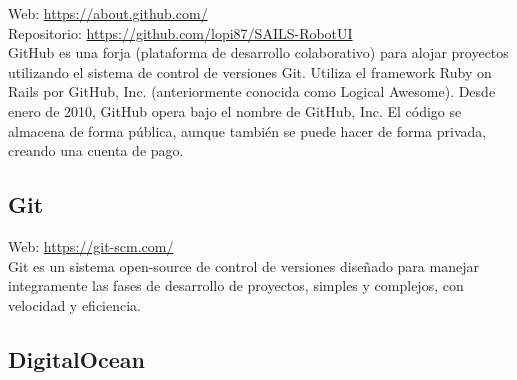 
Web: \url{https://about.github.com/}\\
Repositorio: \url{https://github.com/lopi87/SAILS-RobotUI}\\


GitHub es una forja (plataforma de desarrollo colaborativo) para alojar proyectos utilizando el sistema de control de versiones Git. Utiliza el framework Ruby on Rails por GitHub, Inc. (anteriormente conocida como Logical Awesome). Desde enero de 2010, GitHub opera bajo el nombre de GitHub, Inc. El código se almacena de forma pública, aunque también se puede hacer de forma privada, creando una cuenta de pago.


\subsection{Git}


Web: \url{https://git-scm.com/}\\

Git es un sistema open-source de control de versiones diseñado para manejar integramente las fases de desarrollo de proyectos, simples y complejos, con velocidad y eficiencia.\\

\subsection{DigitalOcean}

